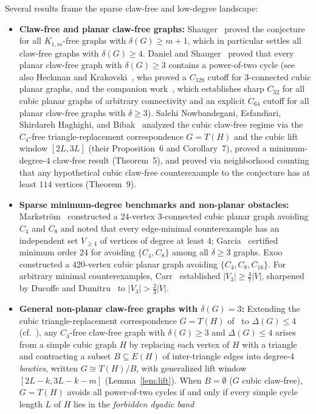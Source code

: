 \documentclass[11pt,reqno]{amsart}
\theoremstyle{plain}
\theoremstyle{definition}
\theoremstyle{remark}
\newcommand{\EG}{\text{Erd\H{o}s--Gy\'arf\'as}}
\DeclareRobustCommand{\_}{\ifmmode\text{\textunderscore}\else\textunderscore\allowbreak\fi}
\begin{document}
Several results frame the sparse claw-free and low-degree landscape:
\begin{itemize}[leftmargin=1.8em]
  \item \textbf{Claw-free and planar claw-free graphs:} Shauger~\cite{Shauger1998} proved the \EG{} conjecture for all $K_{1,m}$-free graphs with $\delta(G) \ge m + 1$, which in particular settles all claw-free graphs with $\delta(G) \ge 4$. Daniel and Shauger~\cite{DanielShauger2001} proved that every planar claw-free graph with $\delta(G) \ge 3$ contains a power-of-two cycle (see also Heckman and Krakovski~\cite{HeckmanKrakovski2013}, who proved a $C_{128}$ cutoff for $3$-connected cubic planar graphs, and the companion work~\cite{RehwaldtPaper1}, which establishes sharp $C_{32}$ for all cubic planar graphs of arbitrary connectivity and an explicit $C_{64}$ cutoff for all planar claw-free graphs with $\delta \ge 3$). Salehi Nowbandegani, Esfandiari, Shirdareh Haghighi, and Bibak~\cite{SalehiNowbandegani2014} analyzed the cubic claw-free regime via the $C_4$-free triangle-replacement correspondence $G = T(H)$ and the cubic lift window $[2L, 3L]$ (their Proposition~6 and Corollary~7), proved a minimum-degree-$4$ claw-free result (Theorem~5), and proved via neighborhood counting that any hypothetical cubic claw-free counterexample to the \EG{} conjecture has at least $114$ vertices (Theorem~9).
  \item \textbf{Sparse minimum-degree benchmarks and non-planar obstacles:} Markstr\"om~\cite{Markstrom2004} constructed a $24$-vertex $3$-connected cubic planar graph avoiding $C_4$ and $C_8$ and noted that every edge-minimal counterexample has an independent set $V_{\ge 4}$ of vertices of degree at least $4$; Garcia~\cite{Garcia2026} certified minimum order $24$ for avoiding $\{C_4, C_8\}$ among all $\delta \ge 3$ graphs. Exoo~\cite{Exoo2014} constructed a $420$-vertex cubic planar graph avoiding $\{C_4, C_8, C_{16}\}$. For arbitrary minimal counterexamples, Carr~\cite{Carr2026} established $|V_3| \ge \frac{4}{7}|V|$, sharpened by Ducoffe and Dumitru~\cite{DucoffeDumitru2026} to $|V_3| > \frac{2}{3}|V|$.
  \item \textbf{General non-planar claw-free graphs with $\delta(G) = 3$:} Extending the cubic triangle-replacement correspondence $G = T(H)$ of~\cite{SalehiNowbandegani2014} to $\Delta(G) \le 4$ (cf.\ \cite{Shauger1998,DanielShauger2001}), any $C_4$-free claw-free graph with $\delta(G) \ge 3$ and $\Delta(G) \le 4$ arises from a simple cubic graph $H$ by replacing each vertex of $H$ with a triangle and contracting a subset $B \subseteq E(H)$ of inter-triangle edges into degree-$4$ \emph{bowties}, written $G \cong T(H)/B$, with generalized lift window $[2L - k, 3L - k - m]$ (Lemma~\ref{lem:lift}). When $B = \emptyset$ ($G$ cubic claw-free), $G = T(H)$ avoids all power-of-two cycles if and only if every simple cycle length $L$ of $H$ lies in the \emph{forbidden dyadic band}

\end{itemize}
\end{document}
